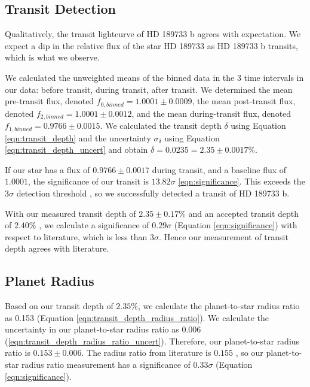 \documentclass[twocolumn]{aastex631}
\begin{document}
\subsection{Transit Detection} \label{subsec:transit_detection}

Qualitatively, the transit lightcurve of HD 189733 b agrees with expectation. We expect a dip in the relative flux of the star HD 189733 as HD 189733 b transits, which is what we observe. 

We calculated the unweighted means of the binned data in the 3 time intervals in our data: before transit, during transit, after transit. We determined the mean pre-transit flux, denoted $f_{0,binned} = 1.0001 \pm 0.0009$, the mean post-transit flux, denoted $f_{2,binned} = 1.0001 \pm 0.0012$, and the mean during-transit flux, denoted $f_{1,binned} = 0.9766 \pm 0.0015$. We calculated the transit depth $\delta$ using Equation \ref{eqn:transit_depth} and the uncertainty $\sigma_\delta$ using Equation \ref{eqn:transit_depth_uncert} and obtain $\delta = 0.0235 = 2.35 \pm 0.0017 \%$. 

If our star has a flux of $0.9766\pm 0.0017$ during transit, and a baseline flux of $1.0001$, the significance of our transit is $13.82\sigma$ \ref{eqn:significance}. This exceeds the $3\sigma$ detection threshold \citep{vdl_2022}, so we successfully detected a transit of HD 189733 b.

With our measured transit depth of $2.35 \pm 0.17 \%$ and an accepted transit depth of $2.40 \%$ \citep{Cauley_2017}, we calculate a significance of $0.29\sigma$ (Equation \ref{eqn:significance}) with respect to literature, which is less than $3\sigma$. Hence our measurement of transit depth agrees with literature.

\subsection{Planet Radius} \label{subsec:planetrad}

Based on our transit depth of $2.35\%$, we calculate the planet-to-star radius ratio as 0.153 (Equation \ref{eqn:transit_depth_radius_ratio}). We calculate the uncertainty in our planet-to-star radius ratio as 0.006 (\ref{eqn:transit_depth_radius_ratio_uncert}). Therefore, our planet-to-star radius ratio is $0.153 \pm 0.006$. The radius ratio from literature is $0.155$ \citep{sing_2009}, so our planet-to-star radius ratio measurement has a significance of $0.33\sigma$ (Equation \ref{eqn:significance}).
\end{document}
